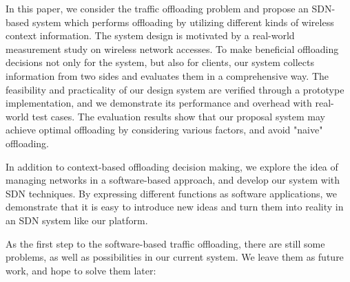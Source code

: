 \documentclass[english]{tktltiki}
\begin{document}
In this paper, we consider the traffic offloading problem and propose an SDN-based system which performs offloading by utilizing different kinds of wireless context information. The system design is motivated by a real-world measurement study on wireless network accesses. To make beneficial offloading decisions not only for the system, but also for clients, our system collects information from two sides and evaluates them in a comprehensive way. The feasibility and practicality of our design system are verified through a prototype implementation, and we demonstrate its performance and overhead with real-world test cases. The evaluation results show that our proposal system may achieve optimal offloading by considering various factors, and avoid "naive" offloading.

In addition to context-based offloading decision making, we explore the idea of managing networks in a software-based approach, and develop our system with SDN techniques. By expressing different functions as software applications, we demonstrate that it is easy to introduce new ideas and turn them into reality in an SDN system like our platform.

As the first step to the software-based traffic offloading, there are still some problems, as well as possibilities in our current system. We leave them as future work, and hope to solve them later:
\end{document}
